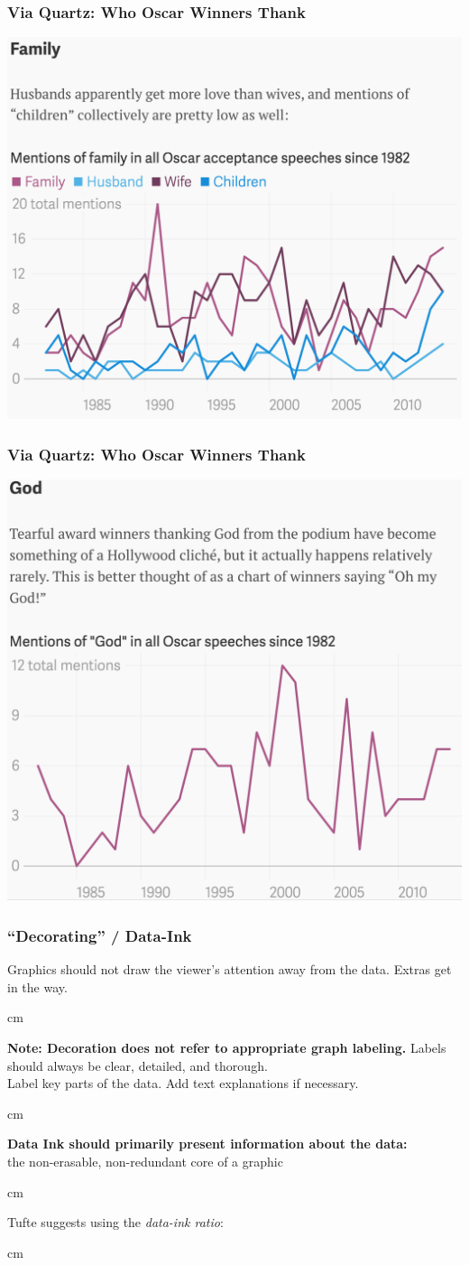\documentclass{beamer} %
\begin{document}
\begin{frame}\frametitle{Via Quartz:  Who Oscar Winners Thank}
	\includegraphics[width=0.7\linewidth]{family.png}
\end{frame}

\begin{frame}\frametitle{Via Quartz:  Who Oscar Winners Thank}
	\includegraphics[width=0.7\linewidth]{god.png}
\end{frame}



\begin{frame}\frametitle{``Decorating'' / Data-Ink}
	\small
	
	Graphics should not draw the viewer's attention away from the data.  Extras get in the way.
	
	 cm
	
	\textbf{Note:  Decoration does not refer to appropriate graph labeling.}  Labels should always be clear, detailed, and thorough.  \\Label key parts of the data.  Add text explanations if necessary.
	
	 cm
	
	\textbf{Data Ink should primarily present information about the data:}  \\the non-erasable, non-redundant core of a graphic
	
	 cm
	
	Tufte suggests using the \emph{data-ink ratio}:
	
	 cm
\end{frame}
\end{document}

